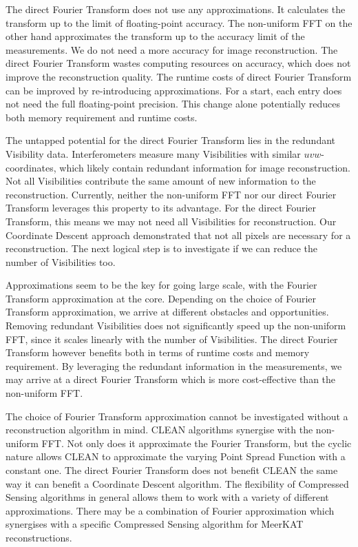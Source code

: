 The direct Fourier Transform does not use any approximations. It calculates the transform up to the limit of floating-point accuracy. The non-uniform FFT on the other hand approximates the transform up to the accuracy limit of the measurements\cite{pratley2017robust}. We do not need a more accuracy for image reconstruction. The direct Fourier Transform wastes computing resources on accuracy, which does not improve the reconstruction quality. The runtime costs of direct Fourier Transform can be improved by re-introducing approximations. For a start, each entry does not need the full floating-point precision. This change alone potentially reduces both memory requirement and runtime costs. 

The untapped potential for the direct Fourier Transform lies in the redundant Visibility data. Interferometers measure many Visibilities with similar $uvw$-coordinates, which likely contain redundant information for image reconstruction. Not all Visibilities contribute the same amount of new information to the reconstruction. Currently, neither the non-uniform FFT nor our direct Fourier Transform leverages this property to its advantage. For the direct Fourier Transform, this means we may not need all Visibilities for reconstruction. Our Coordinate Descent approach demonstrated that not all pixels are necessary for a reconstruction. The next logical step is to investigate if we can reduce the number of Visibilities too.

Approximations seem to be the key for going large scale, with the Fourier Transform approximation at the core. Depending on the choice of Fourier Transform approximation, we arrive at different obstacles and opportunities. Removing redundant Visibilities does not significantly speed up the non-uniform FFT, since it scales linearly with the number of Visibilities. The direct Fourier Transform however benefits both in terms of runtime costs and memory requirement. By leveraging the redundant information in the measurements, we may arrive at a direct Fourier Transform which is more cost-effective than the non-uniform FFT.

The choice of Fourier Transform approximation cannot be investigated without a reconstruction algorithm in mind. CLEAN algorithms synergise with the non-uniform FFT. Not only does it approximate the Fourier Transform, but the cyclic nature allows CLEAN to approximate the varying Point Spread Function with a constant one. The direct Fourier Transform does not benefit CLEAN the same way it can benefit a Coordinate Descent algorithm. The flexibility of Compressed Sensing algorithms in general allows them to work with a variety of different approximations. There may be a combination of Fourier approximation which synergises with a specific Compressed Sensing algorithm for MeerKAT reconstructions.

